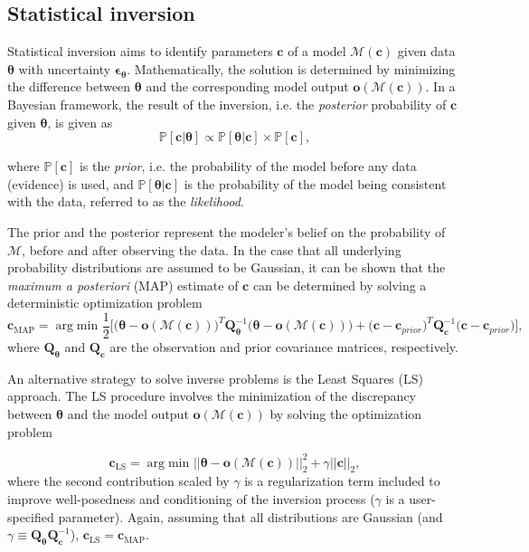 \documentclass[a4paper]{ar-1col}
\begin{document}
\begin{textbox}[h]
\section{Statistical inversion }

Statistical inversion aims to identify parameters $\bm{c}$ of a model ${\mathcal M (\bm{c} )}$ given data $\bm{\theta}$  with  uncertainty $\bm{\epsilon}_{\bm{\theta}}$. Mathematically, the solution 
is determined by minimizing the difference between $\bm{\theta}$ and the corresponding model output $\bm{o}({\mathcal M}(\bm{c}))$.
In a Bayesian framework, the result of the inversion, i.e. the {\em posterior} probability of $\bm{c}$ given $\bm{\theta}$, is given as
\[
\mathbb{P}[ \bm{c} | \bm{\theta}]  \propto  \mathbb{P}[\bm{\theta} |  \bm{c}] \times \mathbb{P}[  \bm{c}],
\]

\noindent where $\mathbb{P}[ \bm{c}]$ is the  {\em prior}, i.e.  the probability of the model before any data (evidence) is used, and   $\mathbb{P}[\bm{\theta} |  \bm{c}]$ is the probability of the model being consistent with the data, referred to as  the \emph{likelihood}.

The prior and the posterior represent the modeler's belief on the probability of $\mathcal{M}$, before and after  observing the data.
In the case that all underlying probability distributions are assumed to be Gaussian, it can be shown \citep{aster2011parameter} that the \textit{maximum a posteriori} (MAP) estimate of $\bm c$ can be determined by solving a deterministic optimization problem
\[
\bm{c}_\textrm{MAP} = \operatorname{arg} \text{min } \frac{1}{2}\bigg[\big(\bm{\theta} - \bm{o}(\mathcal{M}(\bm{c}))\big)^T { \bm{Q}^{-1}_{\bm{\theta}}}\big(\bm{\theta} - \bm{o}(\mathcal{M}(\bm{c}))\big) + \big(\bm{c} - \bm{c}_{prior}\big)^T \bm{Q}^{-1}_{\bm{c}}\big(\bm{c} - \bm{c}_{prior}\big)\bigg],
\]
where ${ \bm{Q}_{\bm{\theta}}}$ and ${ \bm{Q}_{\bm{c}}}$ are the observation and prior covariance matrices, respectively. 

An alternative strategy  to solve inverse problems is the Least Squares (LS) approach. The LS procedure  
involves the minimization of the discrepancy between $\bm{\theta}$ and the model output $\bm{o}(\mathcal{M}(\bm{c}))$ by solving the optimization problem 

\[
\bm{c}_\textrm{LS}  = \operatorname{arg} \text{min } || \bm{\theta}-\bm{o}(\mathcal{M}(\bm{c})) ||_2^2 + \gamma ||\bm{c}||_2,
\]
\noindent where the second contribution scaled by $\gamma$ is a regularization term included to improve well-posedness and conditioning of the inversion process  ($\gamma$ is a user-specified parameter).
Again, assuming that all distributions are Gaussian (and $\gamma \equiv \bm{Q}_{\bm{\theta}} \bm{Q}_{\bm{c}}^{-1}$), $\bm{c}_\textrm{LS} = \bm{c}_\textrm{MAP}$.

\end{textbox}
\end{document}
